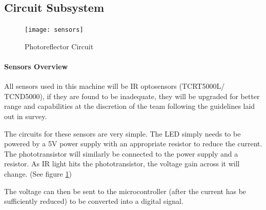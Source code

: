 \documentclass[11pt]{report}
\begin{document}
\subsection{Circuit Subsystem}
\begin{figure}
  \begin{center}
    \texttt{[image: sensors]}
  \end{center}
  \caption{Photoreflector Circuit}
  \label{SensorDiagram}
\end{figure}

\paragraph{Sensors Overview}

All sensors used in this machine will be IR optosensors (TCRT5000L/ TCND5000), if they are found to be inadequate, they will be upgraded for better range and capabilities at the discretion of the team following the guidelines laid out in survey.

The circuits for these sensors are very simple. The LED simply needs to be powered by a 5V power supply with an appropriate resistor to reduce the current. The phototransistor will similarly be connected to the power supply and a resistor. As IR light hits the phototransistor, the voltage gain across it will change. (See figure \ref{SensorDiagram})

The voltage can then be sent to the microcontroller (after the current has be sufficiently reduced) to be converted into a digital signal.
\end{document}
